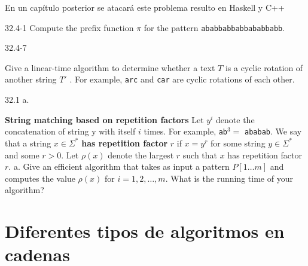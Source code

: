 \begin{algorithm}[H]
\end{algorithm}

En un capítulo posterior se atacará este problema resulto en Haskell y C++ %

\begin{tcolorbox}
32.4-1
Compute the prefix function $\pi$ for the pattern \texttt{ababbabbabbababbabb}.
\end{tcolorbox}

\begin{tcolorbox}
\hypertarget{cyclic_rotation}{32.4-7}
Give a linear-time algorithm to determine whether a text $T$ is a cyclic rotation of another string
$T'$ . For example, \texttt{arc} and \texttt{car} are cyclic rotations of each other.
\end{tcolorbox}

\begin{tcolorbox}
\hypertarget{repetition_factor}{32.1 a.}
\textbf{String matching based on repetition factors}
Let $y^i$ denote the concatenation of string y with itself $i$ times. For example,
\texttt{ab}$^3 =$ \texttt{ababab}. We say that a string $x \in \Sigma^*$
\textbf{has repetition factor} $r$ if $x = y^r$ for some string $y \in \Sigma^*$ and some $r > 0$.
Let $\rho(x)$ denote the largest $r$ such that $x$ has repetition factor $r$.
a. Give an efficient algorithm that takes as input a pattern $P[1 \ldots m]$ and computes the value
$\rho(x)$ for $i = 1,2,\ldots,m$. What is the running time of your algorithm?
\end{tcolorbox}

\section{Diferentes tipos de algoritmos en cadenas}
